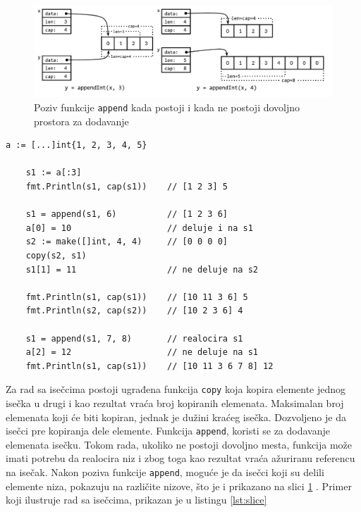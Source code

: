 \documentclass[12pt,oneside]{memoir}
\begin{document}
\begin{figure}
\begin{center}
\includegraphics[scale=0.37]{slice.png}
\end{center}
\caption{Poziv funkcije \texttt{append} kada postoji i kada ne postoji dovoljno prostora za dodavanje}
\label{fig:slice}
\end{figure}

\begin{center}
\begin{lstlisting}[caption=Primer koji demonstrira rad sa isečcima, label={lst:slice},  backgroundcolor=\color{background}]
	a := [...]int{1, 2, 3, 4, 5}
	
	s1 := a[:3] 				
	fmt.Println(s1, cap(s1))	// [1 2 3] 5
	
	s1 = append(s1, 6) 			// [1 2 3 6]
	a[0] = 10					// deluje i na s1
	s2 := make([]int, 4, 4)		// [0 0 0 0] 
	copy(s2, s1)
	s1[1] = 11					// ne deluje na s2
	
	fmt.Println(s1, cap(s1)) 	// [10 11 3 6] 5
	fmt.Println(s2, cap(s2)) 	// [10 2 3 6] 4
	
	s1 = append(s1, 7, 8)		// realocira s1
	a[2] = 12					// ne deluje na s1
	fmt.Println(s1, cap(s1))	// [10 11 3 6 7 8] 12
\end{lstlisting}
\end{center}

Za rad sa isečcima postoji ugrađena funkcija \texttt{copy} koja kopira elemente jednog isečka u drugi i kao rezultat vraća broj kopiranih elemenata. Maksimalan broj elemenata koji će biti kopiran, jednak je dužini kraćeg isečka. Dozvoljeno je da isečci pre kopiranja dele elemente. Funkcija \texttt{append}, koristi se za dodavanje elemenata isečku. Tokom rada, ukoliko ne postoji dovoljno mesta, funkcija može imati potrebu da realocira niz i zbog toga kao rezultat vraća ažuriranu referencu na isečak. Nakon poziva funkcije \texttt{append}, moguće je da isečci koji su delili elemente niza, pokazuju na različite nizove, što je i prikazano na slici \ref{fig:slice} \cite{bookGoProg}. Primer koji ilustruje rad sa isečcima, prikazan je u listingu \ref{lst:slice}
\\
\end{document}
